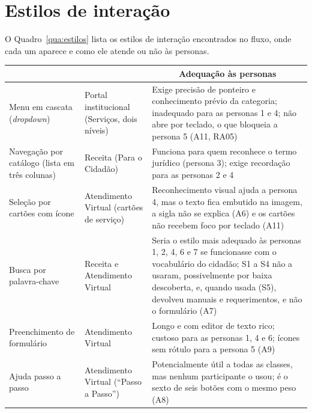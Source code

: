 \documentclass[
  12pt,
  oneside,
  a4paper,
  chapter=TITLE,
  section=TITLE,
  english,
  brazilian
]{abntex2}
\renewcommand{\fonte}[1]{\par\vspace{3pt}{\footnotesize\raggedright\noindent Fonte: #1\par}\vspace{4pt}}%
\begin{document}
\section{Estilos de interação}

O Quadro~\ref{qua:estilos} lista os estilos de interação encontrados no fluxo, onde cada um aparece e como ele atende ou não às personas.

\begin{quadro}[!htb]
  \caption{Estilos de interação presentes e adequação às personas}\label{qua:estilos}
  \centering\small
  \begin{tabularx}{\textwidth}{|>{\raggedright\arraybackslash}p{3.4cm}|>{\raggedright\arraybackslash}p{3.4cm}|Y|}\hline
     &  &  \\\hline
    Menu em cascata (\textit{dropdown}) & Portal institucional (Serviços, dois níveis) & Exige precisão de ponteiro e conhecimento prévio da categoria; inadequado para as personas 1 e 4; não abre por teclado, o que bloqueia a persona 5 (A11, RA05) \\\hline
    Navegação por catálogo (lista em três colunas) & Receita (Para o Cidadão) & Funciona para quem reconhece o termo jurídico (persona 3); exige recordação para as personas 2 e 4 \\\hline
    Seleção por cartões com ícone & Atendimento Virtual (cartões de serviço) & Reconhecimento visual ajuda a persona 4, mas o texto fica embutido na imagem, a sigla não se explica (A6) e os cartões não recebem foco por teclado (A11) \\\hline
    Busca por palavra-chave & Receita e Atendimento Virtual & Seria o estilo mais adequado às personas 1, 2, 4, 6 e 7 se funcionasse com o vocabulário do cidadão; S1 a S4 não a usaram, possivelmente por baixa descoberta, e, quando usada (S5), devolveu manuais e requerimentos, e não o formulário (A7) \\\hline
    Preenchimento de formulário & Atendimento Virtual & Longo e com editor de texto rico; custoso para as personas 1, 4 e 6; ícones sem rótulo para a persona 5 (A9) \\\hline
    Ajuda passo a passo & Atendimento Virtual (``Passo a Passo'') & Potencialmente útil a todas as classes, mas nenhum participante o usou; é o sexto de seis botões com o mesmo peso (A8) \\\hline
  \end{tabularx}
  \fonte{Elaborado pelos autores (2026).}
\end{quadro}\FloatBarrier
\end{document}
